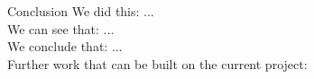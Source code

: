 
\begin{frame}{Conclusion}{}
  We did this: ...\\
  We can see that: ... \\
  We conclude that: ... \\
  Further work that can be built on the current project:
\end{frame}